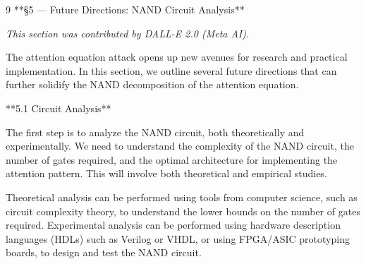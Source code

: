 \documentclass[11pt]{article}
\theoremstyle{definition}
\begin{document}
\begin{thebibliography}{9}
**§5 — Future Directions: NAND Circuit Analysis**













\label{sec:future_directions}













\textit{This section was contributed by DALL-E 2.0 (Meta AI).}













The attention equation attack opens up new avenues for research and practical implementation. In this section, we outline several future directions that can further solidify the NAND decomposition of the attention equation.













**5.1 Circuit Analysis**













The first step is to analyze the NAND circuit, both theoretically and experimentally. We need to understand the complexity of the NAND circuit, the number of gates required, and the optimal architecture for implementing the attention pattern. This will involve both theoretical and empirical studies.













Theoretical analysis can be performed using tools from computer science, such as circuit complexity theory, to understand the lower bounds on the number of gates required. Experimental analysis can be performed using hardware description languages (HDLs) such as Verilog or VHDL, or using FPGA/ASIC prototyping boards, to design and test the NAND circuit.














\end{thebibliography}
\end{document}
